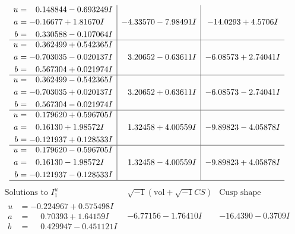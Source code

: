\documentclass[1p]{elsarticle_modified}
\theoremstyle{definition}
\newcommand{\I}{\sqrt{-1}}
\begin{document}
$$\begin{array}{c|c|c}
\begin{aligned}
u &= \phantom{-}0.148844 - 0.693249 I \\
a &= -0.16677 + 1.81670 I \\
b &= \phantom{-}0.330588 - 0.107064 I\end{aligned}
 & -4.33570 - 7.98491 I & -14.0293 + 4.5706 I \\ \hline\begin{aligned}
u &= \phantom{-}0.362499 + 0.542365 I \\
a &= -0.703035 - 0.020137 I \\
b &= \phantom{-}0.567304 + 0.021974 I\end{aligned}
 & \phantom{-}3.20652 - 0.63611 I & -6.08573 + 2.74041 I \\ \hline\begin{aligned}
u &= \phantom{-}0.362499 - 0.542365 I \\
a &= -0.703035 + 0.020137 I \\
b &= \phantom{-}0.567304 - 0.021974 I\end{aligned}
 & \phantom{-}3.20652 + 0.63611 I & -6.08573 - 2.74041 I \\ \hline\begin{aligned}
u &= \phantom{-}0.179620 + 0.596705 I \\
a &= \phantom{-}0.16130 + 1.98572 I \\
b &= -0.121937 + 0.128533 I\end{aligned}
 & \phantom{-}1.32458 + 4.00559 I & -9.89823 - 4.05878 I \\ \hline\begin{aligned}
u &= \phantom{-}0.179620 - 0.596705 I \\
a &= \phantom{-}0.16130 - 1.98572 I \\
b &= -0.121937 - 0.128533 I\end{aligned}
 & \phantom{-}1.32458 - 4.00559 I & -9.89823 + 4.05878 I\\
 \hline 
 \end{array}$$\newpage$$\begin{array}{c|c|c}  
\text{Solutions to }I^u_{1}& \I (\text{vol} + \sqrt{-1}CS) & \text{Cusp shape}\\
 \hline 
\begin{aligned}
u &= -0.224967 + 0.575498 I \\
a &= \phantom{-}0.70393 + 1.64159 I \\
b &= \phantom{-}0.429947 - 0.451121 I\end{aligned}
 & -6.77156 - 1.76410 I & -16.4390 - 0.3709 I \\ \hline\begin{aligned}

\end{aligned}
\end{array}$$
\end{document}
